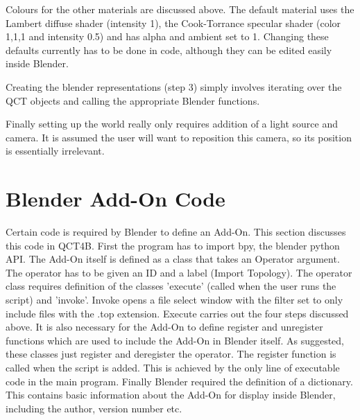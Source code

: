 \documentclass{report}
\begin{document}
Colours for the other materials are discussed above. The default material uses the Lambert diffuse shader 
(intensity 1), the Cook-Torrance specular shader (color 1,1,1 and intensity 0.5) and has alpha and ambient set to 1.
Changing these defaults currently has to be done in code, although they can be edited easily inside Blender.

Creating the blender representations (step 3) simply involves iterating over the QCT objects and calling the 
appropriate Blender functions.

Finally setting up the world really only requires addition of a light source and camera.
It is assumed the user will want to reposition this camera, so its position is essentially irrelevant.

\section{Blender Add-On Code}

Certain code is required by Blender to define an Add-On. This section discusses this code in QCT4B.
First the program has to import bpy, the blender python API.
The Add-On itself is defined as a class that takes an Operator argument.
The operator has to be given an ID 
 and a label (Import Topology).
The operator class requires definition of the classes 'execute' (called when the user runs the script)
and 'invoke'.
Invoke opens a file select window with the filter set to only include files with the .top extension.
Execute carries out the four steps discussed above.
It is also necessary for the Add-On to define register and unregister functions which are used to include the Add-On 
in Blender itself.
As suggested, these classes just register and deregister the operator. The register function is called when the 
script is added.
This is achieved by the only line of executable code in the main program.
Finally Blender required the definition of a dictionary. %
This contains basic information about the Add-On for display inside Blender, including the author, version number etc.
\end{document}
